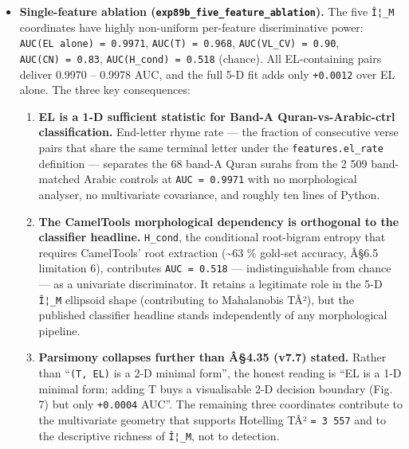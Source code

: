 \documentclass[
]{article}
\providecommand{\tightlist}{%
  \setlength{\itemsep}{0pt}\setlength{\parskip}{0pt}}
\begin{document}
\begin{itemize}
\item
  \textbf{Single-feature ablation
  (\texttt{exp89b\_five\_feature\_ablation}).} The five \texttt{Î¦\_M}
  coordinates have highly non-uniform per-feature discriminative power:
  \texttt{AUC(EL\ alone)\ =\ 0.9971}, \texttt{AUC(T)\ =\ 0.968},
  \texttt{AUC(VL\_CV)\ =\ 0.90}, \texttt{AUC(CN)\ =\ 0.83},
  \texttt{AUC(H\_cond)\ =\ 0.518} (chance). All EL-containing pairs
  deliver 0.9970 -- 0.9978 AUC, and the full 5-D fit adds only
  \texttt{+0.0012} over EL alone. The three key consequences:

  \begin{enumerate}
  \def\labelenumi{\arabic{enumi}.}
  \tightlist
  \item
    \textbf{EL is a 1-D sufficient statistic for Band-A
    Quran-vs-Arabic-ctrl classification.} End-letter rhyme rate --- the
    fraction of consecutive verse pairs that share the same terminal
    letter under the \texttt{features.el\_rate} definition --- separates
    the 68 band-A Quran surahs from the 2 509 band-matched Arabic
    controls at \texttt{AUC\ =\ 0.9971} with no morphological analyser,
    no multivariate covariance, and roughly ten lines of Python.
  \item
    \textbf{The CamelTools morphological dependency is orthogonal to the
    classifier headline.} \texttt{H\_cond}, the conditional root-bigram
    entropy that requires CamelTools' root extraction (\textasciitilde63
    \% gold-set accuracy, Â§6.5 limitation 6), contributes
    \texttt{AUC\ =\ 0.518} --- indistinguishable from chance --- as a
    univariate discriminator. It retains a legitimate role in the 5-D
    \texttt{Î¦\_M} ellipsoid shape (contributing to Mahalanobis TÂ²),
    but the published classifier headline stands independently of any
    morphological pipeline.
  \item
    \textbf{Parsimony collapses further than Â§4.35 (v7.7) stated.}
    Rather than ``\texttt{(T,\ EL)} is a 2-D minimal form'', the honest
    reading is ``EL is a 1-D minimal form; adding T buys a visualisable
    2-D decision boundary (Fig. 7) but only \texttt{+0.0004} AUC''. The
    remaining three coordinates contribute to the multivariate geometry
    that supports Hotelling TÂ² \texttt{=\ 3\ 557} and to the
    descriptive richness of \texttt{Î¦\_M}, not to detection.
  \end{enumerate}


\end{itemize}
\end{document}
